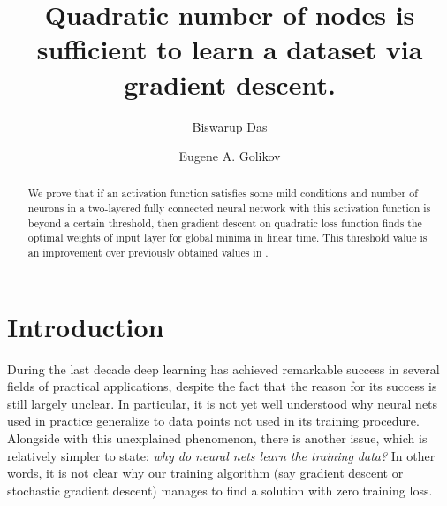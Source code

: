 \documentclass[a4paper,11pt]{amsart}
\theoremstyle{definition}
\theoremstyle{plain}
\theoremstyle{remark}
\begin{document}
\title[
  Quadratic number of nodes suffices to learn a dataset.
]%
{
  Quadratic number of nodes is sufficient to learn a dataset via gradient descent.
}
\author{Biswarup Das}
\address{} 
\address{Biswarup Das}
\address{Laboratory of advanced combinatorics and network applications.}
\address{Moscow Institute of Physics and Technology, Russia.}
\author{Eugene A. Golikov}
\address{}
\address{Eugene A. Golikov}
\address{Laboratory of neural systems and deep learning.}
\address{Moscow Institute of Physics and Technology, Russia.}

\begin{abstract}
We prove that if an activation function satisfies some mild conditions and number of neurons in a two-layered fully connected neural network with this activation function is beyond a certain threshold, then gradient descent on quadratic loss function finds the optimal weights of input layer for global minima in linear time. 
This threshold value is an improvement over previously obtained values in \cite{gdescentOverPara1, gdescentOverPara2}. 
\end{abstract}

\maketitle 

\section{Introduction}

During the last decade deep learning has achieved remarkable success in several fields of practical applications, despite the fact that the reason for its success is still largely unclear.
In particular, it is not yet well understood why neural nets used in practice generalize to data points not used in its training procedure.
Alongside with this unexplained phenomenon, there is another issue, which is relatively simpler to state: {\it why do neural nets learn the training data?}
In other words, it is not clear why our training algorithm (say gradient descent or stochastic gradient descent) manages to find a solution with zero training loss.
\end{document}
